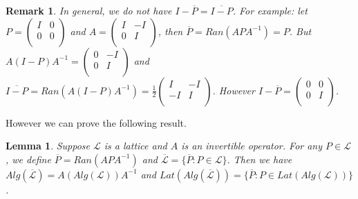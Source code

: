 \documentclass{jaums}
\theoremstyle{thmit} %
\newtheorem{lemma}[theorem]{Lemma}
\theoremstyle{thmrm} %
\newtheorem{remark}{Remark}
\begin{document}
\begin{remark} 
In general, we do not have $I-\overline{P}=\overline{I-P}$. For
example: let $P=\left(                                                         
          \begin{array}{cc} 
            I & 0 \\                                                     
            0 & 0 \\                                                            
          \end{array}
        \right)$ 
and $A=\left(\begin{array}{cc}
       I & -I \\
       0 & I \\
\end{array}
\right)$,
then $\overline{P}=Ran(APA^{-1})=P$. But $A(I-P)A^{-1}=\left(
\begin{array}{cc}
  0 & -I \\
  0 & I \\
\end{array}
\right)$ and 
$\overline{I-P}=Ran(A(I-P)A^{-1})=\frac{1}{2}\left(
                                  \begin{array}{cc}
                                   I & -I \\
                                  -I & I \\
                                  \end{array}
\right)$. However $I-\overline{P}=\left(
                        \begin{array}{cc}
                          0 & 0 \\
                          0 & I \\
                        \end{array}
                      \right)$.
\end{remark}

However we can prove the following result.

\begin{lemma} Suppose $\mathcal{L}$ is a lattice and $A$ is an invertible
operator. For any $P\in\mathcal{L}$, we define $\overline{P}=Ran(APA^{-1})$
and $\overline{\mathcal{L}}=\{\overline{P}:P\in\mathcal{L}\}$. Then we have
$Alg(\overline{\mathcal{L}})=A (Alg(\mathcal{L}))A^{-1}$ and
$Lat(Alg(\overline{\mathcal{L}}))=\{\overline{P}:P\in Lat(Alg(\mathcal{L}))\}$.
\end{lemma}
\end{document}
